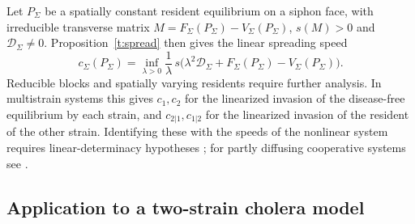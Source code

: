 \label{ss:kpp-siphon}
Let $P_\Sigma$ be a spatially constant resident equilibrium on a siphon face, with irreducible transverse matrix $M=F_\Sigma(P_\Sigma)-V_\Sigma(P_\Sigma)$, $s(M)>0$ and $\mathcal D_\Sigma\ne0$. Proposition~\ref{t:spread} then gives the linear spreading speed
\[
 c_\Sigma(P_\Sigma)=\inf_{\lambda>0}\frac1\lambda\,s\bigl(\lambda^2\mathcal D_\Sigma+F_\Sigma(P_\Sigma)-V_\Sigma(P_\Sigma)\bigr).
\]
Reducible blocks and spatially varying residents require further analysis.
In multistrain systems this gives $c_1,c_2$ for the linearized invasion of the disease-free equilibrium by each strain, and $c_{2|1},c_{1|2}$ for the linearized invasion of the resident of the other strain.
Identifying these with the speeds of the nonlinear system requires linear-determinacy hypotheses \cite{WeinbergerLewisLi2002}; for partly diffusing cooperative systems see \cite{Li2012}.
\eeR

\subsection{Application to a two-strain cholera model}
\label{ss:kpp-two-strain}

